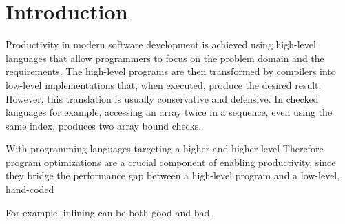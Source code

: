 \section{Introduction}
\label{sec:intro}

Productivity in modern software development is achieved using high-level languages that allow programmers to focus on the problem domain and the requirements. The high-level programs are then transformed by compilers into low-level implementations that, when executed, produce the desired result. However, this translation is usually conservative and defensive. In checked languages for example, accessing an array twice in a sequence, even using the same index, produces two array bound checks.

With programming languages targeting a higher and higher level  Therefore program optimizations are a crucial component of enabling productivity, since they bridge the performance gap between a high-level program and a low-level, hand-coded


 For example, inlining can be both good and bad.











